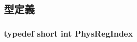 \subsection{型定義}
\hypertarget{o3_2comm_8hh_a5ec29599c4bc29a3054c451674969e7b}{
\subsubsection[{PhysRegIndex}]{\setlength{\rightskip}{0pt plus 5cm}typedef short int {\bf PhysRegIndex}}}
\label{o3_2comm_8hh_a5ec29599c4bc29a3054c451674969e7b}
